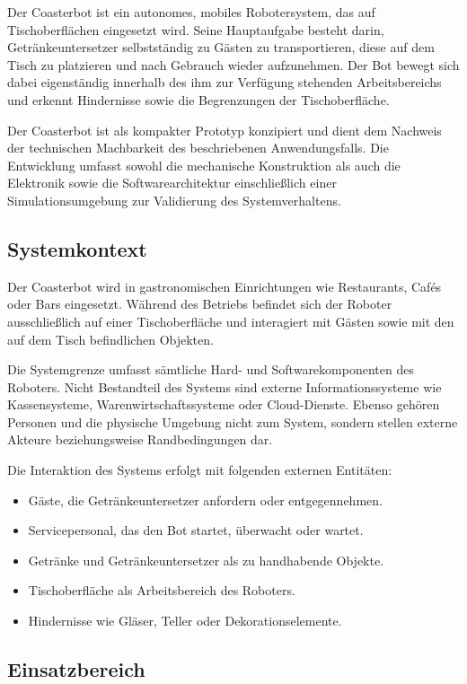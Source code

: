 Der Coasterbot ist ein autonomes, mobiles Robotersystem, das auf
Tischoberflächen eingesetzt wird. Seine Hauptaufgabe besteht darin,
Getränkeuntersetzer selbstständig zu Gästen zu transportieren, diese auf
dem Tisch zu platzieren und nach Gebrauch wieder aufzunehmen. Der Bot
bewegt sich dabei eigenständig innerhalb des ihm zur Verfügung stehenden
Arbeitsbereichs und erkennt Hindernisse sowie die Begrenzungen der
Tischoberfläche.

Der Coasterbot ist als kompakter Prototyp konzipiert und dient dem
Nachweis der technischen Machbarkeit des beschriebenen Anwendungsfalls.
Die Entwicklung umfasst sowohl die mechanische Konstruktion als auch die
Elektronik sowie die Softwarearchitektur einschließlich einer
Simulationsumgebung zur Validierung des Systemverhaltens.

\subsection{Systemkontext}\label{systemkontext}

Der Coasterbot wird in gastronomischen Einrichtungen wie Restaurants,
Cafés oder Bars eingesetzt. Während des Betriebs befindet sich der
Roboter ausschließlich auf einer Tischoberfläche und interagiert mit
Gästen sowie mit den auf dem Tisch befindlichen Objekten.

Die Systemgrenze umfasst sämtliche Hard- und Softwarekomponenten des
Roboters. Nicht Bestandteil des Systems sind externe Informationssysteme
wie Kassensysteme, Warenwirtschaftssysteme oder Cloud-Dienste. Ebenso
gehören Personen und die physische Umgebung nicht zum System, sondern
stellen externe Akteure beziehungsweise Randbedingungen dar.

Die Interaktion des Systems erfolgt mit folgenden externen Entitäten:

\begin{itemize}
\tightlist
\item
  Gäste, die Getränkeuntersetzer anfordern oder entgegennehmen.
\item
  Servicepersonal, das den Bot startet, überwacht oder wartet.
\item
  Getränke und Getränkeuntersetzer als zu handhabende Objekte.
\item
  Tischoberfläche als Arbeitsbereich des Roboters.
\item
  Hindernisse wie Gläser, Teller oder Dekorationselemente.
\end{itemize}

\subsection{Einsatzbereich}\label{einsatzbereich}

